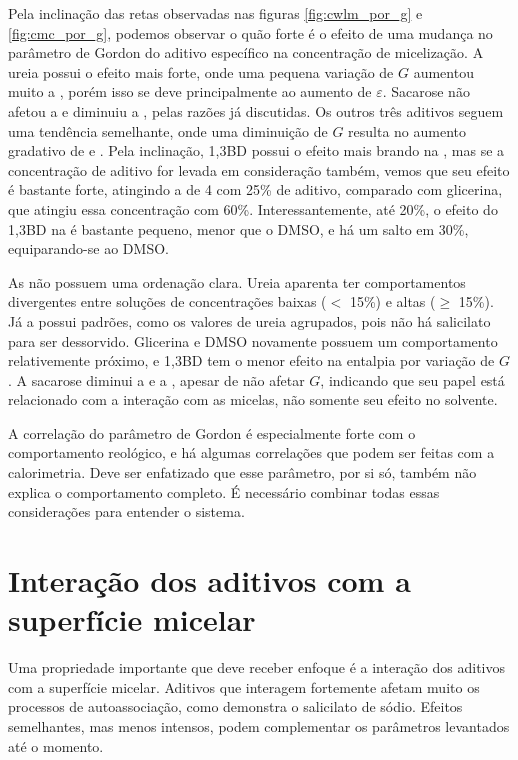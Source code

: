 		Pela inclinação das retas observadas nas figuras \ref{fig:cwlm_por_g} e \ref{fig:cmc_por_g}, podemos observar o quão forte é o efeito de uma mudança no parâmetro de Gordon do aditivo específico na concentração de micelização. A ureia possui o efeito mais forte, onde uma pequena variação de \(G\) aumentou muito a \cmc, porém isso se deve principalmente ao aumento de \(\varepsilon\). Sacarose não afetou a \cwlm{} e diminuiu a \cmc, pelas razões já discutidas. Os outros três aditivos seguem uma tendência semelhante, onde uma diminuição de \(G\) resulta no aumento gradativo de \cwlm{} e \cmc. Pela inclinação, 1,3BD possui o efeito mais brando na \cwlm, mas se a concentração de aditivo for levada em consideração também, vemos que seu efeito é bastante forte, atingindo a \cwlm{} de 4 \mM{} com 25\% de aditivo, comparado com glicerina, que atingiu essa concentração com 60\%. Interessantemente, até 20\%, o efeito do 1,3BD na \cmc{} é bastante pequeno, menor que o DMSO, e há um salto em 30\%, equiparando-se ao DMSO.
				
		As \DHwlm{} não possuem uma ordenação clara. Ureia aparenta ter comportamentos divergentes entre soluções de concentrações baixas (\(<\) 15\%) e altas (\(\ge\) 15\%). Já a \DHmic{} possui padrões, como os valores de ureia agrupados, pois não há salicilato para ser dessorvido. Glicerina e DMSO novamente possuem um comportamento relativemente próximo, e 1,3BD tem o menor efeito na entalpia por variação de \(G\). A sacarose diminui a \DHmic{} e a \cmc{}, apesar de não afetar \(G\), indicando que seu papel está relacionado com a interação com as micelas, não somente seu efeito no solvente.
		
		A correlação do parâmetro de Gordon é especialmente forte com o comportamento reológico, e há algumas correlações que podem ser feitas com a calorimetria. Deve ser enfatizado que esse parâmetro, por si só, também não explica o comportamento completo. É necessário combinar todas essas considerações para entender o sistema.
		\FloatBarrier
		
		\section{Interação dos aditivos com a superfície micelar}
		
		Uma propriedade importante que deve receber enfoque é a interação dos aditivos com a superfície micelar. Aditivos que interagem fortemente afetam muito os processos de autoassociação, como demonstra o salicilato de sódio. Efeitos semelhantes, mas menos intensos, podem complementar os parâmetros levantados até o momento.
		
